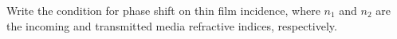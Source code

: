 

\vspace*{\fill}
\centering

Write the condition for phase shift on thin film incidence, where $n_1$ and $n_2$ are the incoming and transmitted media refractive indices, respectively.

\centering
\vspace*{\fill}

